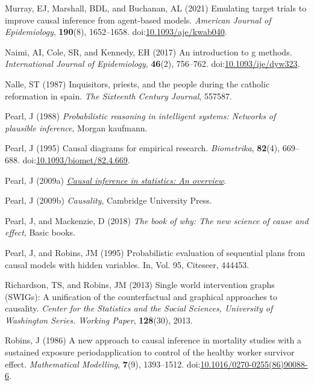 \documentclass[
  singlecolumn,
  9pt]{article}
\begin{document}
\begin{CSLReferences}
Murray, EJ, Marshall, BDL, and Buchanan, AL (2021) Emulating target
trials to improve causal inference from agent-based models.
\emph{American Journal of Epidemiology}, \textbf{190}(8), 1652--1658.
doi:\href{https://doi.org/10.1093/aje/kwab040}{10.1093/aje/kwab040}.

Naimi, AI, Cole, SR, and Kennedy, EH (2017) An introduction to g
methods. \emph{International Journal of Epidemiology}, \textbf{46}(2),
756--762.
doi:\href{https://doi.org/10.1093/ije/dyw323}{10.1093/ije/dyw323}.

Nalle, ST (1987) Inquisitors, priests, and the people during the
catholic reformation in spain. \emph{The Sixteenth Century Journal},
557587.

Pearl, J (1988) \emph{Probabilistic reasoning in intelligent systems:
Networks of plausible inference}, Morgan kaufmann.

Pearl, J (1995) Causal diagrams for empirical research.
\emph{Biometrika}, \textbf{82}(4), 669--688.
doi:\href{https://doi.org/10.1093/biomet/82.4.669}{10.1093/biomet/82.4.669}.

Pearl, J (2009a) \emph{\href{https://doi.org/10.1214/09-SS057}{Causal
inference in statistics: An overview}}.

Pearl, J (2009b) \emph{Causality}, Cambridge University Press.

Pearl, J, and Mackenzie, D (2018) \emph{The book of why: The new science
of cause and effect}, Basic books.

Pearl, J, and Robins, JM (1995) Probabilistic evaluation of sequential
plans from causal models with hidden variables. In, Vol. 95, Citeseer,
444453.

Richardson, TS, and Robins, JM (2013) Single world intervention graphs
(SWIGs): A unification of the counterfactual and graphical approaches to
causality. \emph{Center for the Statistics and the Social Sciences,
University of Washington Series. Working Paper}, \textbf{128}(30), 2013.

Robins, J (1986) A new approach to causal inference in mortality studies
with a sustained exposure period{\textemdash}application to control of
the healthy worker survivor effect. \emph{Mathematical Modelling},
\textbf{7}(9), 1393--1512.
doi:\href{https://doi.org/10.1016/0270-0255(86)90088-6}{10.1016/0270-0255(86)90088-6}.


\end{CSLReferences}
\end{document}

